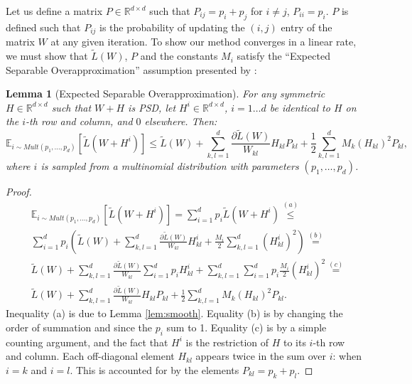 \documentclass{article} %
\newcommand\mat[1]{{#1}}
\newcommand{\W}{\mat{W}}
\newcommand{\Hh}{\mat{H}}
\newcommand{\Pp}{\mat{P}}
\newcommand{\R}{\mathbb{R}}
\newcommand{\tL}{\tilde{L}(\W)}
\newcommand{\grdkl}{\frac{\partial \tL}{\W_{kl}}}
\newtheorem{lemma}{Lemma}
\begin{document}
Let us define a matrix $\Pp \in \R^{d \times d}$ such that $\Pp_{ij} = p_i + p_j$ for $i \ne j$, $\Pp_{ii} = p_i$. $\Pp$ is defined such that $\Pp_{ij}$ is the probability of updating the $(i,j)$ entry of the matrix $\W$ at any given iteration. To show our method converges in a linear rate, we must show that $\tL$, $\Pp$ and the constants $M_i$ satisfy the ``Expected Separable Overapproximation'' assumption presented by \citet{richtarik2013optimal}:

\begin{lemma}[Expected Separable Overapproximation]\label{lem:ESO}
For any symmetric $\Hh \in \R^{d \times d}$ such that $\W + \Hh$ is PSD, let $\Hh^i \in \R^{d \times d}$, $i=1 \ldots d$ be identical to $\Hh$ on the $i$-th row and column, and $0$ elsewhere. Then:
\begin{equation}
\mathbb{E}_{i \sim Mult(p_1, \ldots, p_d)} \left[ \tilde{L}(\W + \Hh^i) \right] \leq 
\tL + \sum_{k,l=1}^d  \grdkl \Hh_{kl} \Pp_{kl} + \frac{1}{2} \sum_{k,l=1}^d   M_k (\Hh_{kl})^2 \Pp_{kl},
\end{equation}
where $i$ is sampled from a multinomial distribution with parameters $(p_1, \ldots , p_d)$.
\end{lemma}

\begin{proof}%
\begin{align*}
&\mathbb{E}_{i \sim Mult(p_1, \ldots, p_d)} \left[ \tilde{L}(\W + \Hh^i) \right] =\sum_{i=1}^d p_i \tilde{L}(\W + \Hh^i) \stackrel{(a)}{\leq} \\
& \sum_{i=1}^d p_i \left(\tL + \sum_{k,l=1}^d \grdkl \Hh_{kl}^i + \frac{M_i}{2} \sum_{k,l=1}^d  (\Hh_{kl}^i)^2 \right) \stackrel{(b)}{=} \\
& \tL + \sum_{k,l=1}^d \grdkl \sum_{i=1}^d  p_i \Hh_{kl}^i + \sum_{k,l=1}^d  \sum_{i=1}^d  p_i \frac{M_i}{2} (\Hh_{kl}^i)^2  \stackrel{(c)}{=} \\
& \tL + \sum_{k,l=1}^d \grdkl \Hh_{kl} \Pp_{kl} + \frac{1}{2} \sum_{k,l=1}^d M_k (\Hh_{kl})^2 \Pp_{kl}.
\end{align*}
Inequality (a) is due to Lemma \ref{lem:smooth}. Equality (b) is by changing the order of summation and since the $p_i$ sum to 1. Equality (c) is by a simple counting argument, and the fact that $\Hh^i$ is the restriction of $\Hh$ to its $i$-th row and column. Each off-diagonal element $\Hh_{kl}$ appears twice in the sum over $i$: when $i=k$ and $i=l$. This is accounted for by the elements $\Pp_{kl} = p_k + p_l$.
\end{proof}
\end{document}
